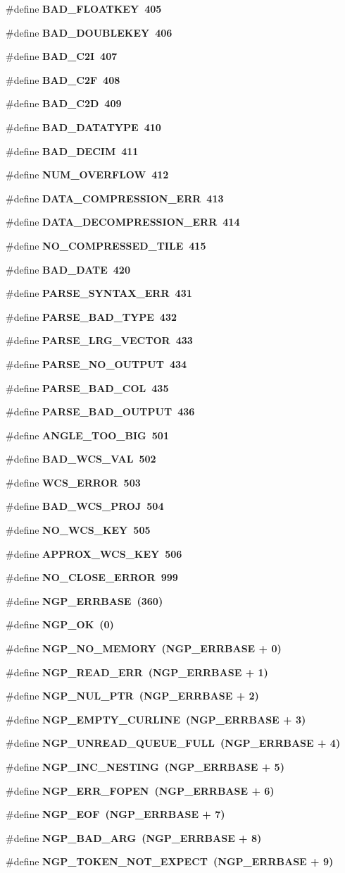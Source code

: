 \begin{CompactItemize}
\#define \bf{BAD\_\-FLOATKEY}~405
\item 
\#define \bf{BAD\_\-DOUBLEKEY}~406
\item 
\#define \bf{BAD\_\-C2I}~407
\item 
\#define \bf{BAD\_\-C2F}~408
\item 
\#define \bf{BAD\_\-C2D}~409
\item 
\#define \bf{BAD\_\-DATATYPE}~410
\item 
\#define \bf{BAD\_\-DECIM}~411
\item 
\#define \bf{NUM\_\-OVERFLOW}~412
\item 
\#define \bf{DATA\_\-COMPRESSION\_\-ERR}~413
\item 
\#define \bf{DATA\_\-DECOMPRESSION\_\-ERR}~414
\item 
\#define \bf{NO\_\-COMPRESSED\_\-TILE}~415
\item 
\#define \bf{BAD\_\-DATE}~420
\item 
\#define \bf{PARSE\_\-SYNTAX\_\-ERR}~431
\item 
\#define \bf{PARSE\_\-BAD\_\-TYPE}~432
\item 
\#define \bf{PARSE\_\-LRG\_\-VECTOR}~433
\item 
\#define \bf{PARSE\_\-NO\_\-OUTPUT}~434
\item 
\#define \bf{PARSE\_\-BAD\_\-COL}~435
\item 
\#define \bf{PARSE\_\-BAD\_\-OUTPUT}~436
\item 
\#define \bf{ANGLE\_\-TOO\_\-BIG}~501
\item 
\#define \bf{BAD\_\-WCS\_\-VAL}~502
\item 
\#define \bf{WCS\_\-ERROR}~503
\item 
\#define \bf{BAD\_\-WCS\_\-PROJ}~504
\item 
\#define \bf{NO\_\-WCS\_\-KEY}~505
\item 
\#define \bf{APPROX\_\-WCS\_\-KEY}~506
\item 
\#define \bf{NO\_\-CLOSE\_\-ERROR}~999
\item 
\#define \bf{NGP\_\-ERRBASE}~(360)
\item 
\#define \bf{NGP\_\-OK}~(0)
\item 
\#define \bf{NGP\_\-NO\_\-MEMORY}~(NGP\_\-ERRBASE + 0)
\item 
\#define \bf{NGP\_\-READ\_\-ERR}~(NGP\_\-ERRBASE + 1)
\item 
\#define \bf{NGP\_\-NUL\_\-PTR}~(NGP\_\-ERRBASE + 2)
\item 
\#define \bf{NGP\_\-EMPTY\_\-CURLINE}~(NGP\_\-ERRBASE + 3)
\item 
\#define \bf{NGP\_\-UNREAD\_\-QUEUE\_\-FULL}~(NGP\_\-ERRBASE + 4)
\item 
\#define \bf{NGP\_\-INC\_\-NESTING}~(NGP\_\-ERRBASE + 5)
\item 
\#define \bf{NGP\_\-ERR\_\-FOPEN}~(NGP\_\-ERRBASE + 6)
\item 
\#define \bf{NGP\_\-EOF}~(NGP\_\-ERRBASE + 7)
\item 
\#define \bf{NGP\_\-BAD\_\-ARG}~(NGP\_\-ERRBASE + 8)
\item 
\#define \bf{NGP\_\-TOKEN\_\-NOT\_\-EXPECT}~(NGP\_\-ERRBASE + 9)
\end{CompactItemize}
